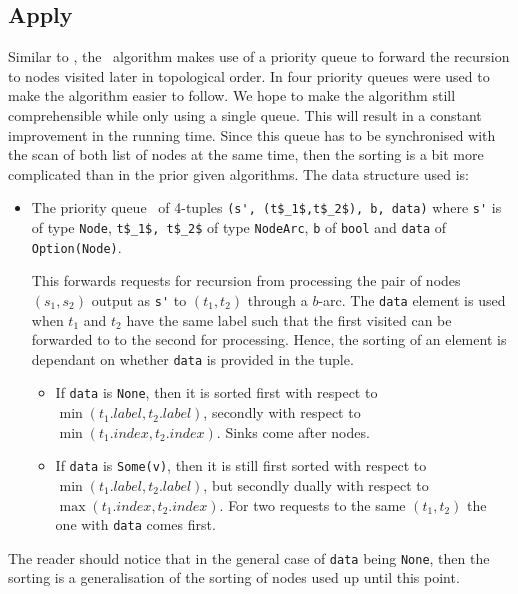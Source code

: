 \subsection{Apply} \label{sec:theory__apply}
Similar to \Restrict, the \Apply\ algorithm makes use of a priority queue to
forward the recursion to nodes visited later in topological order. In
\cite{Arge96} four priority queues were used to make the algorithm easier to
follow. We hope to make the algorithm still comprehensible while only using a
single queue. This will result in a constant improvement in the running time.
Since this queue has to be synchronised with the scan of both list of nodes at
the same time, then the sorting is a bit more complicated than in the prior
given algorithms. The data structure used is:
\begin{itemize}
\item The priority queue \ApplyQrec\ of 4-tuples \lstinline{(s', (t$_1$,t$_2$), b, data)}
  where \lstinline{s'} is of type \lstinline{Node}, \lstinline{t$_1$, t$_2$} of
  type \lstinline{NodeArc}, \lstinline{b} of \lstinline{bool} and
  \lstinline{data} of \lstinline{Option(Node)}.

  This forwards requests for recursion from processing the pair of nodes $(s_1,
  s_2)$ output as \lstinline{s'} to $(t_1,t_2)$ through a $b$-arc. The
  \lstinline{data} element is used when $t_1$ and $t_2$ have the same label such
  that the first visited can be forwarded to to the second for processing.
  Hence, the sorting of an element is dependant on whether \lstinline{data} is
  provided in the tuple.

  \begin{itemize}
  \item If \lstinline{data} is \lstinline{None}, then it is sorted first with
    respect to $\min(t_1.\mathit{label},t_2.\mathit{label})$, secondly with
    respect to $\min(t_1.\mathit{index},t_2.\mathit{index})$. Sinks come after
    nodes.

  \item If \lstinline{data} is \lstinline{Some(v)}, then it is still first
    sorted with respect to $\min(t_1.\mathit{label},t_2.\mathit{label})$, but
    secondly dually with respect to $\max(t_1.\mathit{index},
    t_2.\mathit{index})$. For two requests to the same $(t_1,t_2)$ the one with
    \lstinline{data} comes first.
  \end{itemize}
\end{itemize}
The reader should notice that in the general case of \lstinline{data} being
\lstinline{None}, then the sorting is a generalisation of the sorting of nodes
used up until this point.

